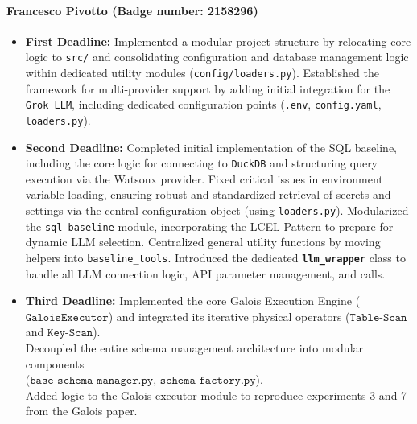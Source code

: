 \paragraph{\textbf{Francesco Pivotto (Badge number: 2158296)}}
\begin{itemize}[leftmargin=*]
    \item \textbf{First Deadline:} Implemented a modular project structure by relocating core logic to \texttt{src/} and consolidating configuration and database management logic within dedicated utility modules (\texttt{config/loaders.py}). 
    Established the framework for multi-provider support by adding initial integration for the \texttt{Grok LLM}, including dedicated configuration points (\texttt{.env}, \texttt{config.yaml}, \texttt{loaders.py}).
    
    \item \textbf{Second Deadline:} Completed initial implementation of the SQL baseline, including the core logic for connecting to \texttt{DuckDB} and structuring query execution via the Watsonx provider.
    Fixed critical issues in environment variable loading, ensuring robust and standardized retrieval of secrets and settings via the central configuration object (using \texttt{loaders.py}).
    Modularized the \texttt{sql\_baseline} module, incorporating the LCEL Pattern to prepare for dynamic LLM selection.
    Centralized general utility functions by moving helpers into \texttt{baseline\_tools}.
    Introduced the dedicated \textbf{\texttt{llm\_wrapper}} class to handle all LLM connection logic, API parameter management, and calls.

    \item \textbf{Third Deadline:} Implemented the core Galois Execution Engine ($\texttt{GaloisExecutor}$) and integrated its iterative physical operators ($\texttt{Table-Scan}$ and $\texttt{Key-Scan}$). \\
    Decoupled the entire schema management architecture into modular components \\ ($\texttt{base\_schema\_manager.py}$, $\texttt{schema\_factory.py}$).\\
    Added logic to the Galois executor module to reproduce experiments 3 and 7 from the Galois paper.\\
    

\end{itemize}

